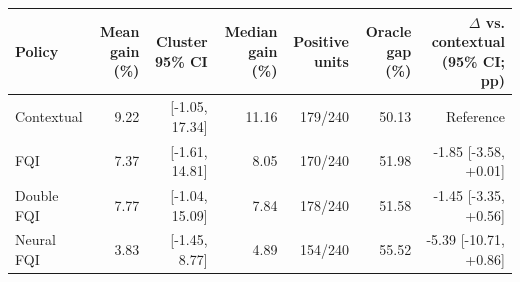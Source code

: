 \begin{tabular}{lrrrrrr}
\toprule
Policy & Mean gain (\%) & Cluster 95\% CI & Median gain (\%) & Positive units & Oracle gap (\%) & $\Delta$ vs. contextual (95\% CI; pp) \\
\midrule
Contextual & 9.22 & [-1.05, 17.34] & 11.16 & 179/240 & 50.13 & Reference \\
FQI & 7.37 & [-1.61, 14.81] & 8.05 & 170/240 & 51.98 & -1.85 [-3.58, +0.01] \\
Double FQI & 7.77 & [-1.04, 15.09] & 7.84 & 178/240 & 51.58 & -1.45 [-3.35, +0.56] \\
Neural FQI & 3.83 & [-1.45, 8.77] & 4.89 & 154/240 & 55.52 & -5.39 [-10.71, +0.86] \\
\bottomrule
\end{tabular}
